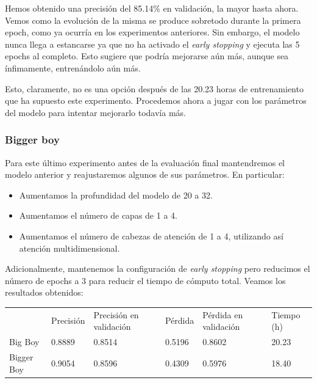 \documentclass[a4paper, 20pt, dvipsnames]{article}
\begin{document}
Hemos obtenido una precisión del 85.14\% en validación, la mayor hasta ahora. Vemos como la evolución de la misma se produce sobretodo durante la primera epoch, como ya ocurría en los experimentos anteriores. Sin embargo, el modelo nunca llega a estancarse ya que no ha activado el \emph{early stopping} y ejecuta las 5 epochs al completo. Esto sugiere que podría mejorarse aún más, aunque sea ínfimamente, entrenándolo aún más.

Esto, claramente, no es una opción después de las 20.23 horas de entrenamiento que ha supuesto este experimento. Procedemos ahora a jugar con los parámetros del modelo para intentar mejorarlo todavía más.

\subsubsection{Bigger boy}

Para este último experimento antes de la evaluación final mantendremos el modelo anterior y reajustaremos algunos de sus parámetros. En particular:


\begin{itemize}
	\item Aumentamos la profundidad del modelo de 20 a 32.
	\item Aumentamos el número de capas de 1 a 4.
	\item Aumentamos el número de cabezas de atención de 1 a 4, utilizando así atención multidimensional.
\end{itemize}

Adicionalmente, mantenemos la configuración de \emph{early stopping} pero reducimos el número de epochs a 3 para reducir el tiempo de cómputo total. Veamos los resultados obtenidos:

\begin{table}[H]
	\centering
	\begin{tabular}{llllll}
		& Precisión & Precisión en validación & Pérdida & Pérdida en validación & Tiempo (h) \\ \cline{2-6} 
		Big Boy    & 0.8889    & 0.8514                  & 0.5196  & 0.8602                & 20.23 \\
		Bigger Boy & 0.9054    & 0.8596                  & 0.4309  & 0.5976                & 18.40
	\end{tabular}
\end{table}
\end{document}
